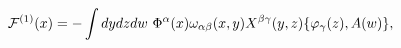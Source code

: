 \begin{equation}
\label{sol-phy} {\cal F}^{(1)}(x)=-\int dy dz dw ~\Phi^\alpha(x)
\omega_{\alpha\beta}(x,y)X^{\beta\gamma}(y,z)\{\varphi_\gamma(z),
A(w)\},
\end{equation}

